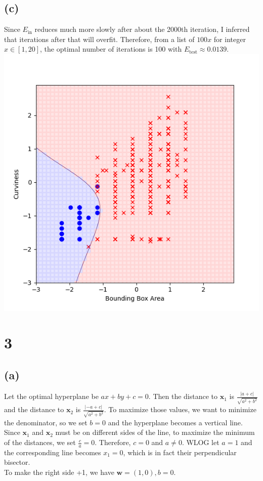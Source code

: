 \documentclass{article}
\begin{document}
	\subsection*{(c)}
		Since $E_\text{in}$ reduces much more slowly after about the 2000th iteration, I inferred that iterations after that will overfit. Therefore, from a list of $100x$ for integer $x \in [1, 20]$, the optimal number of iterations is 100 with $E_\text{test} \approx 0.0139$.\\
		\includegraphics[scale=0.8]{2c}
		
	\section*{3}
	\subsection*{(a)}
		Let the optimal hyperplane be $ax + by + c = 0$. Then the distance to $\mathbf x_1$ is $\frac{|a + c|}{\sqrt{a^2 + b^2}}$ and the distance to $\mathbf x_2$ is $\frac{|-a + c|}{\sqrt{a^2 + b^2}}$. To maximize those values, we want to minimize the denominator, so we set $b = 0$ and the hyperplane becomes a vertical line.\\
		Since $\mathbf x_1$ and $\mathbf x_2$ must be on different sides of the line, to maximize the minimum of the distances, we set $\frac ca = 0$. Therefore, $c = 0$ and $a \neq 0$. WLOG let $a = 1$ and the corresponding line becomes $x_1 = 0$,  which is in fact their perpendicular bisector.\\
		To make the right side +1, we have $\mathbf w = (1, 0), b = 0$.
\end{document}
